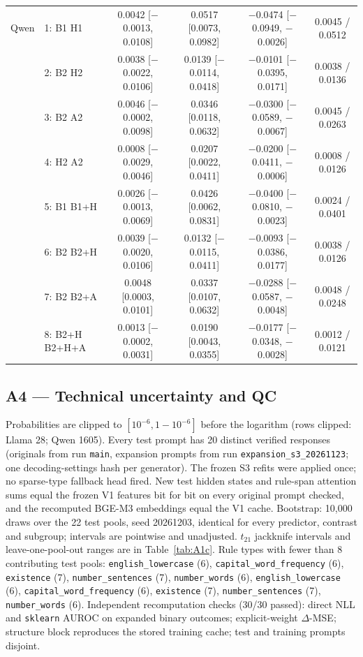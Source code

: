\begin{table}[h]
{\begin{tabular}{llcccc}
\midrule
Qwen & 1: B1 \cto{} H1 & 0.0042 [$-$0.0013, 0.0108] & 0.0517 [0.0073, 0.0982] & $-$0.0474 [$-$0.0949, $-$0.0026] & 0.0045 / 0.0512 \\
 & 2: B2 \cto{} H2 & 0.0038 [$-$0.0022, 0.0106] & 0.0139 [$-$0.0114, 0.0418] & $-$0.0101 [$-$0.0395, 0.0171] & 0.0038 / 0.0136 \\
 & 3: B2 \cto{} A2 & 0.0046 [$-$0.0002, 0.0098] & 0.0346 [0.0118, 0.0632] & $-$0.0300 [$-$0.0589, $-$0.0067] & 0.0045 / 0.0263 \\
 & 4: H2 \cto{} A2 & 0.0008 [$-$0.0029, 0.0046] & 0.0207 [0.0022, 0.0411] & $-$0.0200 [$-$0.0411, $-$0.0006] & 0.0008 / 0.0126 \\
 & 5: B1 \cto{} B1+H & 0.0026 [$-$0.0013, 0.0069] & 0.0426 [0.0062, 0.0831] & $-$0.0400 [$-$0.0810, $-$0.0023] & 0.0024 / 0.0401 \\
 & 6: B2 \cto{} B2+H & 0.0039 [$-$0.0020, 0.0106] & 0.0132 [$-$0.0115, 0.0411] & $-$0.0093 [$-$0.0386, 0.0177] & 0.0038 / 0.0126 \\
 & 7: B2 \cto{} B2+A & 0.0048 [0.0003, 0.0101] & 0.0337 [0.0107, 0.0632] & $-$0.0288 [$-$0.0587, $-$0.0048] & 0.0048 / 0.0248 \\
 & 8: B2+H \cto{} B2+H+A & 0.0013 [$-$0.0002, 0.0031] & 0.0190 [0.0043, 0.0355] & $-$0.0177 [$-$0.0348, $-$0.0028] & 0.0012 / 0.0121 \\
\bottomrule
\end{tabular}
}
\end{table}

\subsection*{A4 --- Technical uncertainty and QC}
Probabilities are clipped to $[10^{-6}, 1-10^{-6}]$ before the logarithm (rows clipped: Llama 28; Qwen 1605). Every test prompt has 20 distinct verified responses (originals from run \texttt{main}, expansion prompts from run \texttt{expansion\_s3\_20261123}; one decoding-settings hash per generator). The frozen S3 refits were applied once; no sparse-type fallback head fired. New test hidden states and rule-span attention sums equal the frozen V1 features bit for bit on every original prompt checked, and the recomputed BGE-M3 embeddings equal the V1 cache. Bootstrap: 10,000 draws over the 22 test pools, seed 20261203, identical for every predictor, contrast and subgroup; intervals are pointwise and unadjusted. $t_{21}$ jackknife intervals and leave-one-pool-out ranges are in Table~\ref{tab:A1c}. Rule types with fewer than 8 contributing test pools: \texttt{english\_lowercase} (6), \texttt{capital\_word\_frequency} (6), \texttt{existence} (7), \texttt{number\_sentences} (7), \texttt{number\_words} (6), \texttt{english\_lowercase} (6), \texttt{capital\_word\_frequency} (6), \texttt{existence} (7), \texttt{number\_sentences} (7), \texttt{number\_words} (6). Independent recomputation checks (30/30 passed): direct NLL and \texttt{sklearn} AUROC on expanded binary outcomes; explicit-weight $\Delta$-MSE; structure block reproduces the stored training cache; test and training prompts disjoint.

